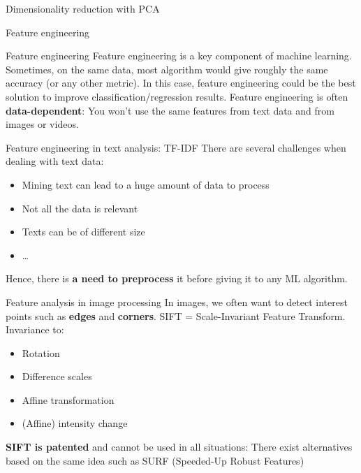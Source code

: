 \documentclass{beamer}
\newcommand{\1}[1]{\mathbbm{1}\left[#1\right]}
\begin{document}
\begin{frame}{Dimensionality reduction with PCA}

\end{frame}


\begin{frame}
\begin{center}
\Huge{Feature engineering}
\end{center}
\end{frame}

\begin{frame}{Feature engineering}
Feature engineering is a key component of machine learning.
\vfill
\pause
Sometimes, on the same data, most algorithm would give roughly the same accuracy (or any other metric). In this case, feature engineering could be the best solution to improve classification/regression results.
\vfill
\pause 
Feature engineering is often \textbf{data-dependent}: You won't use the same features from text data and from images or videos.
\end{frame}

\begin{frame}{Feature engineering in text analysis: TF-IDF}
There are several challenges when dealing with text data:
\begin{itemize}
	\item Mining text can lead to a huge amount of data to process
	\item Not all the data is relevant 
	\item Texts can be of different size
	\item \ldots
\end{itemize}
\pause
\vfill
Hence, there is \textbf{a need to preprocess} it before giving it to any ML algorithm.
\end{frame}

\begin{frame}{Feature analysis in image processing}
In images, we often want to detect interest points such as \textbf{edges} and \textbf{corners}.
\vfill
\pause
SIFT = Scale-Invariant Feature Transform. Invariance to:
\begin{itemize}
	\item Rotation
	\item Difference scales
	\item Affine transformation
	\item (Affine) intensity change
\end{itemize}
\vfill
\pause
\textbf{SIFT is patented} and cannot be used in all situations: There exist alternatives based on the same idea such as SURF (Speeded-Up Robust Features)
\end{frame}
\end{document}
